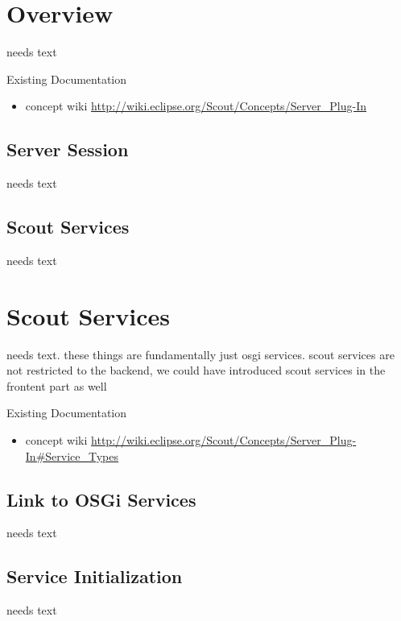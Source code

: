 \documentclass[a4paper,10pt,twoside]{book}
\begin{document}
  \sloppy
\fi


\chapter{Overview}

needs text

\noindent Existing Documentation
\begin{itemize}
  \item concept wiki \url{http://wiki.eclipse.org/Scout/Concepts/Server_Plug-In}
\end{itemize}

\section{Server Session}
needs text

\section{Scout Services}
needs text


\chapter{Scout Services}

needs text. these things are fundamentally just osgi services. 
scout services are not restricted to the backend, we could have introduced scout services in the frontent part as well

\noindent Existing Documentation
\begin{itemize}
  \item concept wiki \url{http://wiki.eclipse.org/Scout/Concepts/Server_Plug-In#Service_Types}
\end{itemize}

\section{Link to OSGi Services}
needs text

\section{Service Initialization}
needs text
\end{document}
